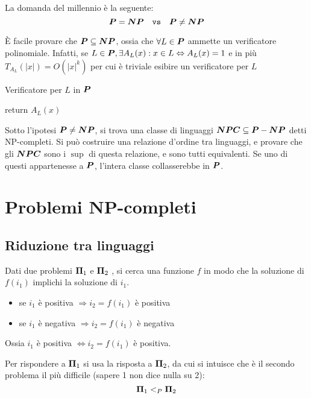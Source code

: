 La domanda del millennio è la seguente:
\begin{equation*}
    \bm{P}{} = \bm{NP}{}
    \quad
    \texttt{vs}
    \quad
    \bm{P}{} \neq \bm{NP}{}
\end{equation*}

È facile provare che $\bm{P}{} \subseteq \bm{NP}{}$, ossia che $\forall L \in \bm{P}{}$ ammette un verificatore polinomiale. Infatti, se $L \in \bm{P}{}, \exists A_{L}(x) : x \in L \Leftrightarrow A_L (x) = 1$ e in più $T_{A_{L}} (|x|) = O \left( |x|^{k} \right)$ per cui è triviale esibire un verificatore per $L$
\begin{algorithm}[H]
    \caption{Verificatore per $L$ in $\bm{P}{}$}\label{alg:verificap}
\begin{algorithmic}[1]
        \State return $A_L (x)$
    \EndProcedure
\end{algorithmic}
\end{algorithm}

Sotto l'ipotesi $\bm{P}{} \neq \bm{NP}{} $, si trova una classe di linguaggi $\bm{NPC}{} \subseteq \bm{P}{} - \bm{NP}{} $ detti NP-completi. Si può costruire una relazione d'ordine tra linguaggi, e provare che gli $\bm{NPC}{}$ sono i $\sup$ di questa relazione, e sono tutti equivalenti. Se uno di questi appartenesse a $\bm{P}{}$, l'intera classe collasserebbe in $\bm{P}{}$.



\section{Problemi NP-completi}

\subsection{Riduzione tra linguaggi}

Dati due problemi
$\bm{\Pi}{}_1$
e
$\bm{\Pi}{}_2$
, si cerca una funzione $f$ in modo che la soluzione di $f(i_1)$ implichi la soluzione di $i_1$.
\begin{itemize}[noitemsep,parsep=0pt,partopsep=0pt,topsep=0pt]
    \item se $i_1$ è positiva $\Rightarrow i_2 = f(i_1)$ è positiva
    \item se $i_1$ è negativa $\Rightarrow i_2 = f(i_1)$ è negativa
\end{itemize}
Ossia $i_1$ è positiva $\Leftrightarrow i_2 = f(i_1)$ è positiva.

Per rispondere a $\bm{\Pi}{}_1$ si usa la risposta a $\bm{\Pi}{}_2$, da cui si intuisce che è il secondo problema il più difficile (sapere 1 non dice nulla su 2):
\begin{equation*}
\bm{\Pi}{}_1
<_P
\bm{\Pi}_2
\end{equation*}

